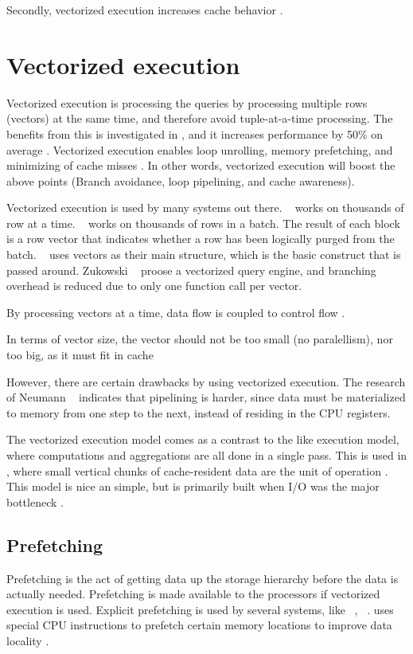 Secondly, vectorized execution increases cache behavior \cite{Larson2013-mc}.

\section{Vectorized execution}
\label{sec:Vectorized execution}
Vectorized execution is processing the queries by processing multiple rows (vectors) at the same time, and therefore avoid tuple-at-a-time processing. The benefits from this is investigated in \cite{Abadi2008-dd}, and it increases performance by 50\% on average . Vectorized execution enables loop unrolling, memory prefetching, and minimizing of cache misses \cite{Larson2013-mc}. In other words, vectorized execution will boost the above points (Branch avoidance, loop pipelining, and cache awareness).

Vectorized execution is used by many systems out there. \ibm~\cite{Raman2013-em} works on thousands of row at a time. \mssql~\cite{Larson2013-mc} works on thousands of rows in a batch. The result of each block is a row vector that indicates whether a row has been logically purged from the batch. \monetx~\cite{Boncz2005-wj} uses vectors as their main structure, which is the basic construct that is passed around. Zukowski \ea~\cite{Zukowski2006-oz} proose a vectorized query engine, and branching overhead is reduced due to only one function call per vector.

By processing vectors at a time, data flow is coupled to control flow \cite{Stonebraker2005-qz, Lamb2012-kg}.

In terms of vector size, the vector should not be too small (no paralellism), nor too big, as it must fit in cache \cite{Boncz2005-wj}

However, there are certain drawbacks by using vectorized execution. The research of Neumann \ea~\cite{Neumann2011-uq} indicates that pipelining is harder, since data must be materialized to memory from one step to the next, instead of residing in the CPU registers.

The vectorized execution model comes as a contrast to the  like execution model, where computations and aggregations are all done in a single pass. This is used in \monetx, where small vertical chunks of cache-resident data are the unit of operation \cite{Boncz2005-wj}. This model is nice an simple, but is primarily built when I/O was the major bottleneck \cite{Neumann2011-uq}.

\subsection{Prefetching}
\label{sub:Prefetching}
Prefetching is the act of getting data up the storage hierarchy before the data is actually needed. Prefetching is made available to the processors if vectorized execution is used. Explicit prefetching is used by several systems, like \ibm~\cite{Raman2013-em}, \monetx~\cite{Boncz2005-wj}. \exasol uses special CPU instructions to prefetch certain memory locations to improve data locality \cite{Exasol2014-xh}.


